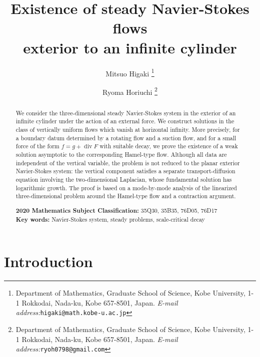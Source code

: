 \documentclass[11pt,a4paper]{article}
\numberwithin{equation}{section}
\newcommand{\opdiv}{\operatorname{div}}
\begin{document}
\title{Existence of steady Navier-Stokes flows \\ exterior to an infinite cylinder}


\author{
Mitsuo Higaki
\thanks{
Department of Mathematics, 
Graduate School of Science, 
Kobe University, 
1-1 Rokkodai, Nada-ku, Kobe 657-8501, Japan.
\textit{E-mail address:}\texttt{higaki@math.kobe-u.ac.jp}
}
\and
Ryoma Horiuchi
\thanks{
Department of Mathematics, 
Graduate School of Science, 
Kobe University, 
1-1 Rokkodai, Nada-ku, Kobe 657-8501, Japan.
\textit{E-mail address:}\texttt{ryoh0798@gmail.com}
}
}


\date{}


\maketitle


\begin{abstract}
We consider the three-dimensional steady Navier-Stokes system in the exterior of an infinite cylinder under the action of an external force. We construct solutions in the class of vertically uniform flows which vanish at horizontal infinity. More precisely, for a boundary datum determined by a rotating flow and a suction flow, and for a small force of the form $f=g+\opdiv F$ with suitable decay, we prove the existence of a weak solution asymptotic to the corresponding Hamel-type flow. Although all data are independent of the vertical variable, the problem is not reduced to the planar exterior Navier-Stokes system: the vertical component satisfies a separate transport-diffusion equation involving the two-dimensional Laplacian, whose fundamental solution has logarithmic growth. The proof is based on a mode-by-mode analysis of the linearized three-dimensional problem around the Hamel-type flow and a contraction argument. 


\bigskip


\noindent \textbf{2020 Mathematics Subject Classification:} 
35Q30, 35B35, 76D05, 76D17 \\
\noindent \textbf{Key words:} 
Navier-Stokes system, steady problems, scale-critical decay 
\end{abstract}


\tableofcontents


\section{Introduction}
\label{sec.intro}
\end{document}
